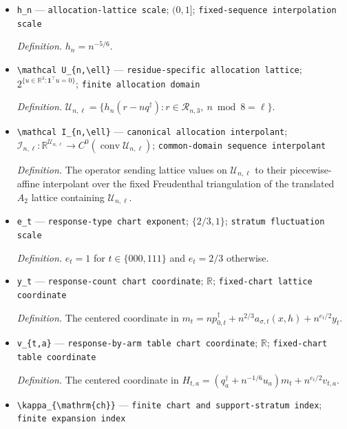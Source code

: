 \documentclass{article}
\begin{document}
\begin{itemize}
  \item \texttt{h\_\allowbreak{}n} --- \texttt{allocation-\allowbreak{}lattice scale}; \((0,1]\); \texttt{fixed-\allowbreak{}sequence interpolation scale}
  \par\smallskip\noindent\emph{Definition.} \(h_n=n^{-5/6}\).
  \item \texttt{\textbackslash{}\allowbreak{}mathcal U\_\allowbreak{}\{n,\allowbreak{}\textbackslash{}\allowbreak{}ell\}\allowbreak{}} --- \texttt{residue-\allowbreak{}specific allocation lattice}; \(2^{\{u\in\mathbb R^3:\mathbf1^\top u=0\}}\); \texttt{finite allocation domain}
  \par\smallskip\noindent\emph{Definition.} \(\mathcal U_{n,\ell}=\{h_n(r-nq^\dagger):r\in\mathcal R_{n,3},\ n\bmod8=\ell\}\).
  \item \texttt{\textbackslash{}\allowbreak{}mathcal I\_\allowbreak{}\{n,\allowbreak{}\textbackslash{}\allowbreak{}ell\}\allowbreak{}} --- \texttt{canonical allocation interpolant}; \(\mathcal I_{n,\ell}:\mathbb R^{\mathcal U_{n,\ell}}\to C^0(\operatorname{conv}\mathcal U_{n,\ell})\); \texttt{common-\allowbreak{}domain sequence interpolant}
  \par\smallskip\noindent\emph{Definition.} The operator sending lattice values on \(\mathcal U_{n,\ell}\) to their piecewise-affine interpolant over the fixed Freudenthal triangulation of the translated \(A_2\) lattice containing \(\mathcal U_{n,\ell}\).
  \item \texttt{e\_\allowbreak{}t} --- \texttt{response-\allowbreak{}type chart exponent}; \(\{2/3,1\}\); \texttt{stratum fluctuation scale}
  \par\smallskip\noindent\emph{Definition.} \(e_t=1\) for \(t\in\{000,111\}\) and \(e_t=2/3\) otherwise.
  \item \texttt{y\_\allowbreak{}t} --- \texttt{response-\allowbreak{}count chart coordinate}; \(\mathbb R\); \texttt{fixed-\allowbreak{}chart lattice coordinate}
  \par\smallskip\noindent\emph{Definition.} The centered coordinate in \(m_t=np_{0,t}^\dagger+n^{2/3}a_{\sigma,t}(x,h)+n^{e_t/2}y_t\).
  \item \texttt{v\_\allowbreak{}\{t,\allowbreak{}a\}\allowbreak{}} --- \texttt{response-\allowbreak{}by-\allowbreak{}arm table chart coordinate}; \(\mathbb R\); \texttt{fixed-\allowbreak{}chart table coordinate}
  \par\smallskip\noindent\emph{Definition.} The centered coordinate in \(H_{t,a}=(q_a^\dagger+n^{-1/6}u_a)m_t+n^{e_t/2}v_{t,a}\).
  \item \texttt{\textbackslash{}\allowbreak{}kappa\_\allowbreak{}\{\textbackslash{}\allowbreak{}mathrm\{ch\}\allowbreak{}\}\allowbreak{}} --- \texttt{finite chart and support-\allowbreak{}stratum index}; \texttt{finite expansion index}

\end{itemize}
\end{document}
